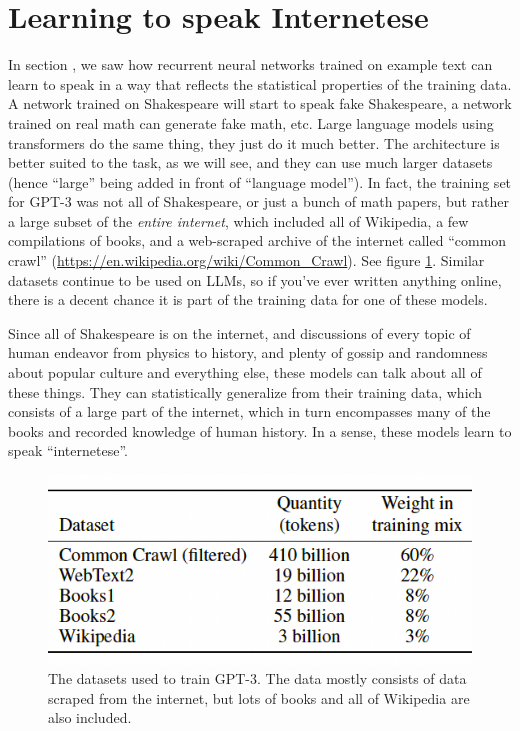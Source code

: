 \section{Learning to speak Internetese}

In section , we saw how recurrent neural networks trained on example text can learn to speak in a way that reflects the statistical properties of the training data. A network trained on Shakespeare will start to speak fake Shakespeare, a network trained on real math can generate fake math, etc. Large language models using transformers do the same thing, they just do it much better. The architecture is better suited to the task, as we will see, and they can use much larger datasets (hence ``large'' being added in front of ``language model''). In fact, the training set for GPT-3 was not all of Shakespeare, or just a bunch of math papers, but rather a large subset of the \emph{entire internet}, which included all of Wikipedia, a few compilations of books, and a web-scraped archive of the internet called ``common crawl'' (\url{https://en.wikipedia.org/wiki/Common_Crawl}). See figure \ref{gptDatasets}. Similar datasets continue to be used on LLMs, so if you've ever written anything online, there is a decent chance it is part of the training data for one of these models. 

Since all of Shakespeare is on the internet, and discussions of every topic of human endeavor from physics to history, and plenty of gossip and randomness about popular culture and everything else, these models can talk about all of these things. They can statistically generalize from their training data, which consists of a large part of the internet, which in turn encompasses many of the books and recorded knowledge of human history. In a sense, these models learn to speak ``internetese''. 

\begin{figure}[h]
\centering
\includegraphics[scale=.4]{./images/gptDatasets}
\caption[From \cite{brown2020language}.]{The datasets used to train GPT-3. The data mostly consists of data scraped from the internet, but lots of books and all of Wikipedia are also included.}
\label{gptDatasets}
\end{figure}

